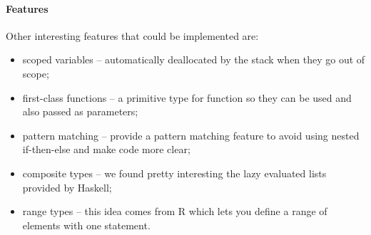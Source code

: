 \paragraph{Features}
Other interesting features that could be implemented are:
\begin{itemize}
	\item scoped variables -- automatically deallocated by the stack when they 
	go out of scope;
	\item first-class functions -- a primitive type for function so they 
	can be used and also passed as parameters;
	\item pattern matching -- provide a pattern matching feature to avoid using
	nested if-then-else and make code more clear;
	\item composite types -- we found pretty interesting the lazy evaluated 
	lists provided by Haskell;
	\item range types -- this idea comes from R which lets you define a
	range of elements with one statement.
\end{itemize}